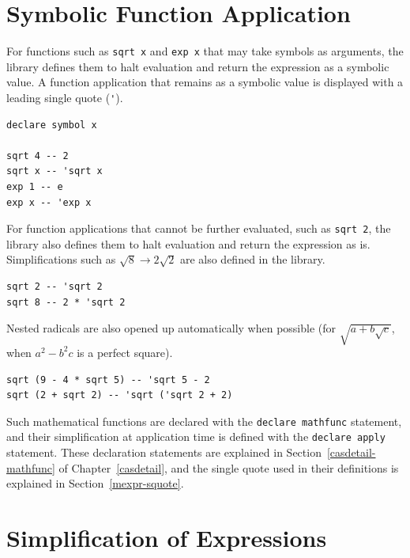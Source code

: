 \section{Symbolic Function Application}\label{cas-symbol2}

For functions such as \lstinline{sqrt x} and \lstinline{exp x} that may take symbols as arguments, the library defines them to halt evaluation and return the expression as a symbolic value.
A function application that remains as a symbolic value is displayed with a leading single quote (\lstinline{'}).
\begin{lstlisting}[language=egison,numbers=none]
declare symbol x

sqrt 4 -- 2
sqrt x -- 'sqrt x
exp 1 -- e
exp x -- 'exp x
\end{lstlisting}

For function applications that cannot be further evaluated, such as \lstinline{sqrt 2}, the library also defines them to halt evaluation and return the expression as is.
Simplifications such as $\sqrt{8} \rightarrow 2 \sqrt{2}$ are also defined in the library.
\begin{lstlisting}[language=egison,numbers=none]
sqrt 2 -- 'sqrt 2
sqrt 8 -- 2 * 'sqrt 2
\end{lstlisting}
Nested radicals are also opened up automatically when possible
(for $\sqrt{a+b\sqrt{c}}$, when $a^2-b^2c$ is a perfect square).
\begin{lstlisting}[language=egison,numbers=none]
sqrt (9 - 4 * sqrt 5) -- 'sqrt 5 - 2
sqrt (2 + sqrt 2) -- 'sqrt ('sqrt 2 + 2)
\end{lstlisting}
Such mathematical functions are declared with the \lstinline{declare mathfunc} statement, and their simplification at application time is defined with the \lstinline{declare apply} statement.
These declaration statements are explained in Section~\ref{casdetail-mathfunc} of Chapter~\ref{casdetail}, and the single quote used in their definitions is explained in Section~\ref{mexpr-squote}.


\section{Simplification of Expressions}\label{cas-simplify}

